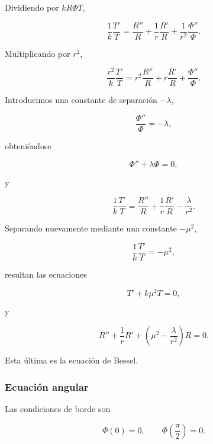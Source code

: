 \documentclass[12pt]{article}
\begin{document}
Dividiendo por $kR\Phi T$,

\begin{equation}
\frac1k\frac{T'}{T}
=
\frac{R''}{R}
+\frac1r\frac{R'}{R}
+\frac1{r^2}\frac{\Phi''}{\Phi}.
\end{equation}

Multiplicando por $r^2$,

\begin{equation}
\frac{r^2}{k}\frac{T'}{T}
=
r^2\frac{R''}{R}
+r\frac{R'}{R}
+\frac{\Phi''}{\Phi}.
\end{equation}

Introducimos una constante de separación $-\lambda$,

\begin{equation}
\frac{\Phi''}{\Phi}=-\lambda,
\end{equation}

obteniéndose

\begin{equation}
\Phi''+\lambda\Phi=0,
\end{equation}

y

\begin{equation}
\frac1k\frac{T'}{T}
=
\frac{R''}{R}
+\frac1r\frac{R'}{R}
-\frac{\lambda}{r^2}.
\end{equation}

Separando nuevamente mediante una constante $-\mu^2$,

\begin{equation}
\frac1k\frac{T'}{T}
=
-\mu^2,
\end{equation}

resultan las ecuaciones

\begin{equation}
T'+k\mu^2T=0,
\end{equation}

y

\begin{equation}
R''+\frac1rR'
+\left(
\mu^2-\frac{\lambda}{r^2}
\right)R=0.
\end{equation}

Esta última es la ecuación de Bessel.

\subsubsection*{Ecuación angular}

Las condiciones de borde son

\[
\Phi(0)=0,
\qquad
\Phi\!\left(\frac{\pi}{2}\right)=0.
\]
\end{document}
